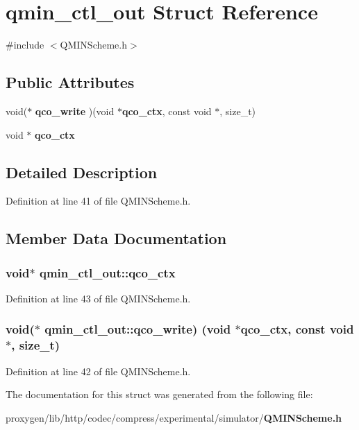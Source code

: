 \section{qmin\+\_\+ctl\+\_\+out Struct Reference}
\label{structqmin__ctl__out}


{\ttfamily \#include $<$Q\+M\+I\+N\+Scheme.\+h$>$}

\subsection*{Public Attributes}
\begin{DoxyCompactItemize}
\item 
void($\ast$ {\bf qco\+\_\+write} )(void $\ast${\bf qco\+\_\+ctx}, const void $\ast$, size\+\_\+t)
\item 
void $\ast$ {\bf qco\+\_\+ctx}
\end{DoxyCompactItemize}


\subsection{Detailed Description}


Definition at line 41 of file Q\+M\+I\+N\+Scheme.\+h.



\subsection{Member Data Documentation}
\subsubsection[{qco\+\_\+ctx}]{\setlength{\rightskip}{0pt plus 5cm}void$\ast$ qmin\+\_\+ctl\+\_\+out\+::qco\+\_\+ctx}\label{structqmin__ctl__out_add8ba4057af610438e2555db0bfbbdc3}


Definition at line 43 of file Q\+M\+I\+N\+Scheme.\+h.

\subsubsection[{qco\+\_\+write}]{\setlength{\rightskip}{0pt plus 5cm}void($\ast$ qmin\+\_\+ctl\+\_\+out\+::qco\+\_\+write) (void $\ast${\bf qco\+\_\+ctx}, const void $\ast$, size\+\_\+t)}\label{structqmin__ctl__out_a360ea021f0df0076749101bdf35dc3f9}


Definition at line 42 of file Q\+M\+I\+N\+Scheme.\+h.



The documentation for this struct was generated from the following file\+:\begin{DoxyCompactItemize}
\item 
proxygen/lib/http/codec/compress/experimental/simulator/{\bf Q\+M\+I\+N\+Scheme.\+h}\end{DoxyCompactItemize}
